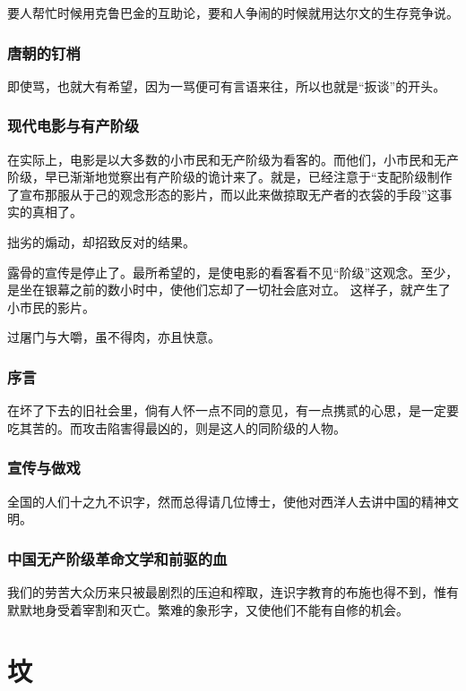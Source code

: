 \documentclass[a4paper]{ctexart}
\begin{document}
\begin{sloppy}
        要人帮忙时候用克鲁巴金的互助论，要和人争闹的时候就用达尔文的生存竞争说。

        \section{
            唐朝的钉梢
        }
        即使骂，也就大有希望，因为一骂便可有言语来往，所以也就是“扳谈”的开头。

        \section{
            现代电影与有产阶级
        }
        在实际上，电影是以大多数的小市民和无产阶级为看客的。而他们，小市民和无产阶级，早已渐渐地觉察出有产阶级的诡计来了。就是，已经注意于“支配阶级制作了宣布那服从于己的观念形态的影片，而以此来做掠取无产者的衣袋的手段”这事实的真相了。

        拙劣的煽动，却招致反对的结果。

        露骨的宣传是停止了。最所希望的，是使电影的看客看不见“阶级”这观念。至少，是坐在银幕之前的数小时中，使他们忘却了一切社会底对立。
        这样子，就产生了小市民的影片。

        过屠门与大嚼，虽不得肉，亦且快意。

        \section{
            序言
        }
        在坏了下去的旧社会里，倘有人怀一点不同的意见，有一点携贰的心思，是一定要吃其苦的。而攻击陷害得最凶的，则是这人的同阶级的人物。

        \section{
            宣传与做戏
        }
        全国的人们十之九不识字，然而总得请几位博士，使他对西洋人去讲中国的精神文明。

        \section{
            中国无产阶级革命文学和前驱的血
        }
        我们的劳苦大众历来只被最剧烈的压迫和榨取，连识字教育的布施也得不到，惟有默默地身受着宰割和灭亡。繁难的象形字，又使他们不能有自修的机会。

        \part{坟}

\end{sloppy}
\end{document}
